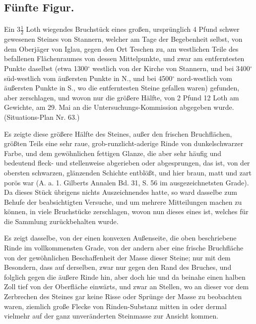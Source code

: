 \documentclass[a4paper, 11pt, oneside, german]{article}
\begin{document}
\subsection{Fünfte Figur.}
\paragraph{}
Ein $3\frac{1}{2}$ Loth wiegendes Bruchstück eines großen, ursprünglich 4 Pfund schwer gewesenen Steines von Stannern, welcher am Tage der Begebenheit selbst, von dem Oberjäger von Iglau, gegen den Ort Teschen zu, am westlichen Teile des befallenen Flächenraumes von dessen Mittelpunkte, und zwar am entferntesten Punkte daselbst (etwa 1300$^{\circ}$ westlich von der Kirche von Stannern, und bei 3400$^{\circ}$ süd-westlich vom äußersten Punkte in N., und bei 4500$^{\circ}$ nord-westlich vom äußersten Punkte in S., wo die entferntesten Steine gefallen waren) gefunden, aber zerschlagen, und wovon nur die größere Hälfte, von 2 Pfund 12 Loth am Gewichte, am 29. Mai an die Untersuchungs-Kommission abgegeben wurde. (Situations-Plan Nr. 63.)

Es zeigte diese größere Hälfte des Steines, außer den frischen Bruchflächen, größten Teils eine sehr raue, grob-runzlicht-aderige Rinde von dunkelschwarzer Farbe, und dem gewöhnlichen fettigen Glanze, die aber sehr häufig und bedeutend fleck- und stellenweise abgerieben oder abgesprungen, das ist, von der obersten schwarzen, glänzenden Schichte entblößt, und hier braun, matt und zart porös war (A. a. 1. Gilberts Annalen Bd. 31, S. 56 im ausgezeichnetsten Grade). Da dieses Stück übrigens nichts Auszeichnendes hatte, so ward dasselbe zum Behufe der beabsichtigten Versuche, und um mehrere Mitteilungen machen zu können, in viele Bruchstücke zerschlagen, wovon nun dieses eines ist, welches für die Sammlung zurückbehalten wurde.

Es zeigt dasselbe, von der einen konvexen Außenseite, die oben beschriebene Rinde im vollkommensten Grade, von der andern aber eine frische Bruchfläche von der gewöhnlichen Beschaffenheit der Masse dieser Steine; nur mit dem Besondern, dass auf derselben, zwar nur gegen den Rand des Bruches, und folglich gegen die äußere Rinde hin, aber doch hie und da beinahe einen halben Zoll tief von der Oberfläche einwärts, und zwar an Stellen, wo an dieser vor dem Zerbrechen des Steines gar keine Risse oder Sprünge der Masse zu beobachten waren, ziemlich große Flecke von Rinden-Substanz mitten in oder dermal vielmehr auf der ganz unveränderten Steinmasse zur Ansicht kommen.
\end{document}
